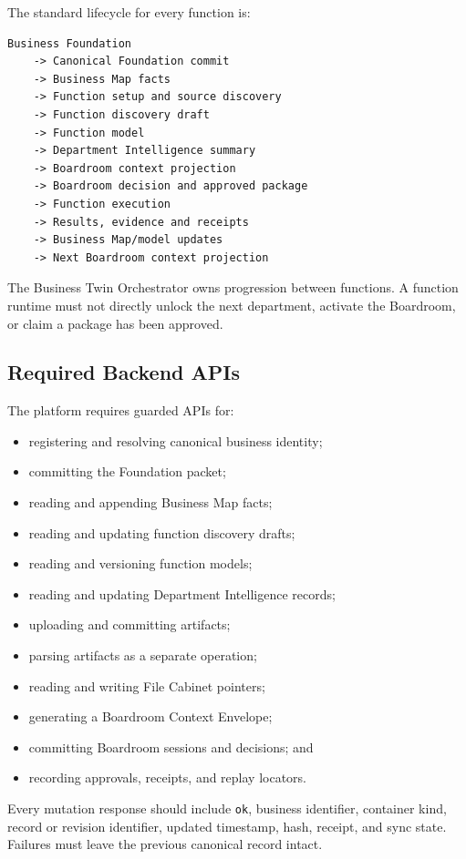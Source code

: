 The standard lifecycle for every function is:

\begin{verbatim}
Business Foundation
    -> Canonical Foundation commit
    -> Business Map facts
    -> Function setup and source discovery
    -> Function discovery draft
    -> Function model
    -> Department Intelligence summary
    -> Boardroom context projection
    -> Boardroom decision and approved package
    -> Function execution
    -> Results, evidence and receipts
    -> Business Map/model updates
    -> Next Boardroom context projection
\end{verbatim}

The Business Twin Orchestrator owns progression between functions. A function
runtime must not directly unlock the next department, activate the Boardroom, or
claim a package has been approved.

\subsection{Required Backend APIs}

The platform requires guarded APIs for:

\begin{itemize}
  \item registering and resolving canonical business identity;
  \item committing the Foundation packet;
  \item reading and appending Business Map facts;
  \item reading and updating function discovery drafts;
  \item reading and versioning function models;
  \item reading and updating Department Intelligence records;
  \item uploading and committing artifacts;
  \item parsing artifacts as a separate operation;
  \item reading and writing File Cabinet pointers;
  \item generating a Boardroom Context Envelope;
  \item committing Boardroom sessions and decisions; and
  \item recording approvals, receipts, and replay locators.
\end{itemize}

Every mutation response should include \texttt{ok}, business identifier,
container kind, record or revision identifier, updated timestamp, hash, receipt,
and sync state. Failures must leave the previous canonical record intact.

